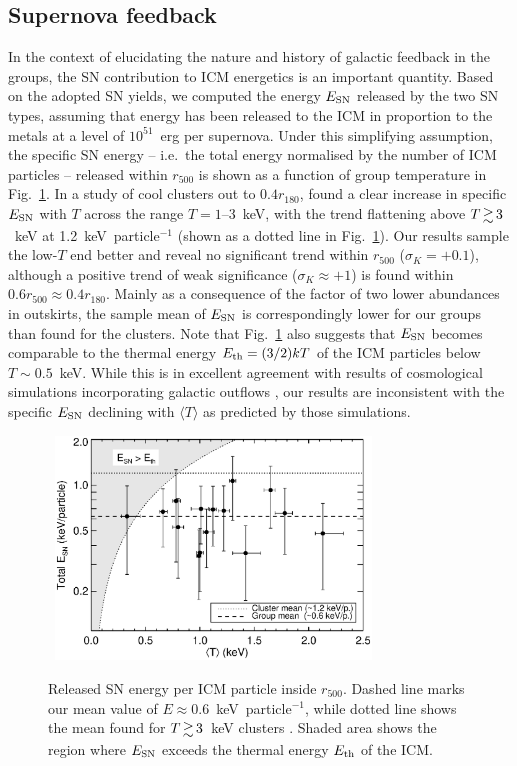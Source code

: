\documentclass[useAMS,usenatbib]{mn2e}
\begin{document}
\subsection{Supernova feedback}\label{sec,SN}

In the context of elucidating the nature and history of galactic
feedback in the groups, the SN contribution to ICM energetics is an
important quantity. Based on the adopted SN yields, we computed the
energy $E_{\rm SN}$ released by the two SN types, assuming that energy
has been released to the ICM in proportion to the metals at a level of
$10^{51}$~erg per supernova. Under this simplifying assumption, the
specific SN energy -- i.e.\ the total energy normalised by the number
of ICM particles -- released within $r_{500}$ is shown as a function
of group temperature in Fig.~\ref{fig,E_SN}. In a study of cool
clusters out to $0.4r_{180}$, \citet{fino01} found a clear increase in
specific $E_{\rm SN}$ with $T$ across the range $T=1$--3~keV, with the
trend flattening above $T\ga 3$~keV at 1.2~keV~particle$^{-1}$ (shown
as a dotted line in Fig.~\ref{fig,E_SN}). Our results sample the
low-$T$ end better and reveal no significant trend within $r_{500}$
($\sigma_K=+0.1$), although a positive trend of weak significance
($\sigma_K \approx +1$) is found within $0.6r_{500} \approx
0.4r_{180}$. Mainly as a consequence of the factor of two lower
abundances in outskirts, the sample mean of $E_{\rm SN}$ is
correspondingly lower for our groups than found for the \citet{fino01}
clusters. Note that Fig.~\ref{fig,E_SN} also suggests that $E_{\rm
SN}$ becomes comparable to the thermal energy $E_{\rm th} = (3/2)kT$
of the ICM particles below $T \sim 0.5$~keV. While this is in
excellent agreement with results of cosmological simulations
incorporating galactic outflows \citep*{dave08}, our results are
inconsistent with the specific $E_{\rm SN}$ declining with $\langle T
\rangle$ as predicted by those simulations.

\begin{figure} 
\mbox{\hspace{0mm} 
  \includegraphics[width=84mm]{fig11.eps}} 
\caption{Released SN energy per ICM particle inside $r_{500}$. Dashed
  line marks our mean value of $E\approx 0.6$~keV~particle$^{-1}$,
  while dotted line shows the mean found for $T\ga 3$~keV clusters
  \citep{fino01}. Shaded area shows the region where $E_{\rm SN}$
  exceeds the thermal energy $E_{\rm th}$ of the ICM.}
\label{fig,E_SN} 
\end{figure} 
\end{document}
